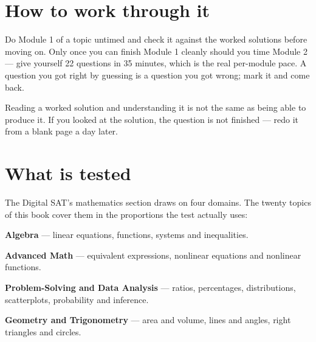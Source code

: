 \section*{How to work through it}

\begin{satstrategy}
Do Module 1 of a topic untimed and check it against the worked solutions
before moving on. Only once you can finish Module 1 cleanly should you time
Module 2 --- give yourself 22 questions in 35 minutes, which is the real
per-module pace. A question you got right by guessing is a question you got
wrong; mark it and come back.
\end{satstrategy}

\begin{sattrap}
Reading a worked solution and understanding it is not the same as being able
to produce it. If you looked at the solution, the question is not finished ---
redo it from a blank page a day later.
\end{sattrap}

\section*{What is tested}

The Digital SAT's mathematics section draws on four domains. The twenty
topics of this book cover them in the proportions the test actually uses:

\begin{satformula}
\begin{list}{\textbf{\color{satteal}\textbullet}}%
  {\setlength{\leftmargin}{16pt}\setlength{\itemsep}{3pt}}
\item \textbf{Algebra} --- linear equations, functions, systems and
      inequalities.
\item \textbf{Advanced Math} --- equivalent expressions, nonlinear equations
      and nonlinear functions.
\item \textbf{Problem-Solving and Data Analysis} --- ratios, percentages,
      distributions, scatterplots, probability and inference.
\item \textbf{Geometry and Trigonometry} --- area and volume, lines and
      angles, right triangles and circles.
\end{list}
\end{satformula}
